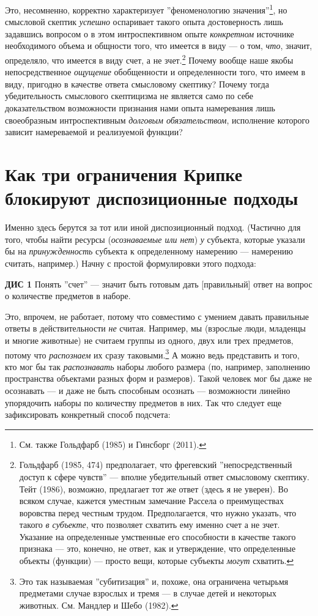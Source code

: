 \documentclass[11pt]{book}
\begin{document}
Это, несомненно, корректно характеризует ''феноменологию значения''\footnote{См. также Гольдфарб (1985) и Гинсборг (2011).}, но смысловой скептик \textit{успешно} оспаривает такого опыта достоверность лишь задавшись вопросом о в этом интроспективном опыте \textit{конкретном} источнике необходимого объема и общности того, что имеется в виду --- о том, \textit{что}, значит, определяло, что имеется в виду счет, а не зчет.\footnote{Гольдфарб (1985, 474) предполагает, что фрегевский ''непосредственный доступ к сфере чувств'' --- вполне убедительный ответ смысловому скептику. Тейт (1986), возможно, предлагает тот же ответ (здесь я не уверен). Во всяком случае, кажется уместным замечание Рассела о преимуществах воровства перед честным трудом. Предполагается, что нужно указать, что такого \textit{в субъекте}, что позволяет схватить ему именно счет а не зчет. Указание на определенные умственные его способности в качестве такого признака --- это, конечно, не ответ, как и утверждение, что определенные объекты (функции) --- просто вещи, которые субъекты \textit{могут} схватить.} Почему вообще наше якобы непосредственное \textit{ощущение} обобщенности и определенности того, что имеем в виду, пригодно в качестве ответа смысловому скептику? Почему тогда убедительность смыслового скептицизма не является само по себе доказательством возможности признания нами опыта намеревания лишь своеобразным интроспективным \textit{долговым обязательством}, исполнение которого зависит намереваемой и реализуемой функции?

\section{Как три ограничения Крипке блокируют диспозиционные подходы}

Именно здесь берутся за тот или иной диспозиционный подход. (Частично для того, чтобы найти ресурсы (\textit{осознаваемые или нет}) \textit{у} субъекта, которые указали бы на \textit{принужденность} субъекта к определенному намерению --- намерению считать, например.) Начну с простой формулировки этого подхода:

\smallskip

  \textbf{ДИС 1} \quad Понять ''счет'' --- значит быть готовым дать [правильный] ответ на вопрос о количестве предметов в наборе.

\smallskip

Это, впрочем, не работает, потому что совместимо с умением давать правильные ответы в действительности \textit{не} считая. Например, мы (взрослые люди, младенцы и многие животные) не считаем группы из одного, двух или трех предметов, потому что \textit{распознаем} их сразу таковыми.\footnote{Это так называемая ''субитизация'' и, похоже, она ограничена четырьмя предметами случае взрослых и тремя --- в случае детей и некоторых животных. См. Мандлер и Шебо (1982).} А можно ведь представить и того, кто мог бы так \textit{распознавать} наборы любого размера (по, например, заполнению пространства объектами разных форм и размеров). Такой человек мог бы даже не осознавать --- и даже не быть способным осознать --- возможности линейно упорядочить наборы по количеству предметов в них. Так что следует еще зафиксировать конкретный способ подсчета:
\end{document}
